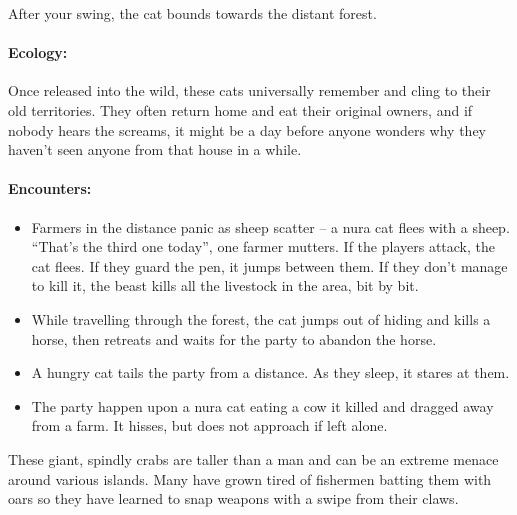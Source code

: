 \begin{multicols}{2}
\begin{boxtext}

  After your swing, the cat bounds towards the distant forest.

\end{boxtext}

\paragraph{Ecology:} Once released into the wild, these cats universally remember and cling to their old territories.
They often return home and eat their original owners, and if nobody hears the screams, it might be a day before anyone wonders why they haven't seen anyone from that house in a while.

\paragraph{Encounters:}

\begin{itemize}

  \item
  Farmers in the distance panic as sheep scatter -- a nura cat flees with a sheep.
  ``That's the third one today'', one farmer mutters.
  If the players attack, the cat flees.
  If they guard the pen, it jumps between them.
  If they don't manage to kill it, the beast kills all the livestock in the area, bit by bit.
  \item
  While travelling through the forest, the cat jumps out of hiding and kills a horse, then retreats and waits for the party to abandon the horse.
  \item
  A hungry cat tails the party from a distance.
  As they sleep, it stares at them.
  \item
  The party happen upon a nura cat eating a cow it killed and dragged away from a farm.
  It hisses, but does not approach if left alone.

\end{itemize}

\nuracat

\label{nura_crab}

These giant, spindly crabs are taller than a man and can be an extreme menace around various islands.
Many have grown tired of fishermen batting them with oars so they have learned to snap weapons with a swipe from their claws.

\begin{boxtext}


\end{boxtext}
\end{multicols}
